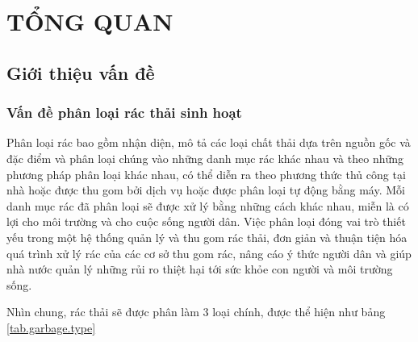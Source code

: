 
\chapter{TỔNG QUAN}

\section{Giới thiệu vấn đề}
\subsection{Vấn đề phân loại rác thải sinh hoạt}
Phân loại rác bao gồm nhận diện, mô tả các loại chất thải dựa trên nguồn gốc và đặc điểm và phân loại chúng vào những danh mục rác khác nhau và theo những phương pháp phân loại khác nhau, có thể diễn ra theo phương thức thủ công tại nhà hoặc được thu gom bởi dịch vụ hoặc được phân loại tự động bằng máy. Mỗi danh mục rác đã phân loại sẽ được xử lý bằng những cách khác nhau, miễn là có lợi cho môi trường và cho cuộc sống người dân. Việc phân loại đóng vai trò thiết yếu trong một hệ thống quản lý và thu gom rác thải, đơn giản và thuận tiện hóa quá trình xử lý rác của các cơ sở thu gom rác, nâng cáo ý thức người dân và giúp nhà nước quản lý những rủi ro thiệt hại tới sức khỏe con người và môi trường sống.

Nhìn chung, rác thải sẽ được phân làm 3 loại chính, được thể hiện như bảng \ref{tab.garbage.type}

